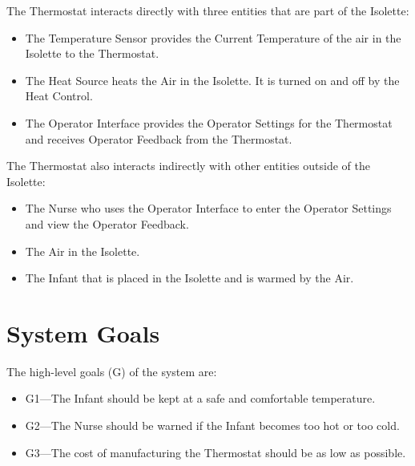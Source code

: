 The Thermostat interacts directly with three entities that are part of the Isolette:
\begin{itemize}
\item The Temperature Sensor provides the Current Temperature of the air in the Isolette to the Thermostat.
\item The Heat Source heats the Air in the Isolette. It is turned on and off by the Heat Control.
\item The Operator Interface provides the Operator Settings for the Thermostat and receives Operator Feedback from the Thermostat.
\end{itemize}

The Thermostat also interacts indirectly with other entities outside of the Isolette:
\begin{itemize}
\item The Nurse who uses the Operator Interface to enter the Operator Settings and view the Operator Feedback.
\item The Air in the Isolette.
\item The Infant that is placed in the Isolette and is warmed by the Air.
\end{itemize}

\section{System Goals}
\label{sec:system-goals}

The high-level goals (G) of the system are:
\begin{itemize}
  \item G1—The Infant should be kept at a safe and comfortable temperature.
  \item G2—The Nurse should be warned if the Infant becomes too hot or too cold.
  \item G3—The cost of manufacturing the Thermostat should be as low as possible.
\end{itemize} 

